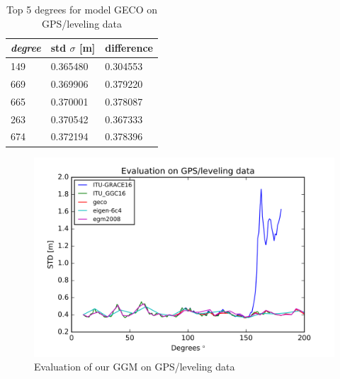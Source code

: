           \begin{table}[]
          	\centering
          	\caption{Top 5 degrees for model GECO on GPS/leveling data}
          	\label{table:ggm_models}
          	\begin{tabular}{@{}lll@{}}
          		\toprule
          		\emph{degree} & std $\sigma$ [m]  & difference\\ \midrule
          		149 &0.365480&    0.304553\\
          		669 &0.369906&   0.379220\\
          		665 &0.370001 &  0.378087\\
          		263 &0.370542 &  0.367333\\
          		674 &0.372194  & 0.378396\\
          		\bottomrule
          		
          	\end{tabular}
          \end{table}
        
        
        \begin{figure}[t]
        	\caption{Evaluation of our GGM on GPS/leveling data}
        	\label{sudan_data}
        	\includegraphics{Figures/classic_style.png}
        	\centering
        \end{figure}
        
